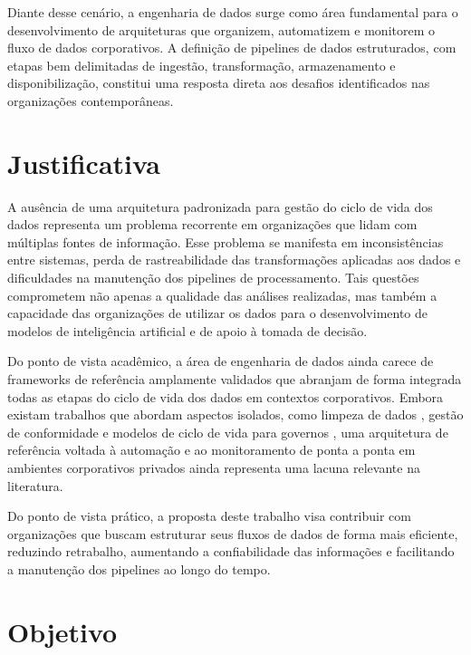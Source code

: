 \documentclass[
    12pt,                %
    openright,           %
    oneside,             %
    a4paper,             %
    english,             %
    brazil               %
]{abntex2}
\begin{document}
Diante desse cenário, a engenharia de dados surge como área fundamental para o desenvolvimento de arquiteturas que organizem, automatizem e monitorem o fluxo de dados corporativos. A definição de pipelines de dados estruturados, com etapas bem delimitadas de ingestão, transformação, armazenamento e disponibilização, constitui uma resposta direta aos desafios identificados nas organizações contemporâneas.

\section{Justificativa}
\label{sec:justificativa}

A ausência de uma arquitetura padronizada para gestão do ciclo de vida dos dados representa um problema recorrente em organizações que lidam com múltiplas fontes de informação. Esse problema se manifesta em inconsistências entre sistemas, perda de rastreabilidade das transformações aplicadas aos dados e dificuldades na manutenção dos pipelines de processamento. Tais questões comprometem não apenas a qualidade das análises realizadas, mas também a capacidade das organizações de utilizar os dados para o desenvolvimento de modelos de inteligência artificial e de apoio à tomada de decisão.

Do ponto de vista acadêmico, a área de engenharia de dados ainda carece de frameworks de referência amplamente validados que abranjam de forma integrada todas as etapas do ciclo de vida dos dados em contextos corporativos. Embora existam trabalhos que abordam aspectos isolados, como limpeza de dados \cite{Valova2025}, gestão de conformidade \cite{Scope2022} e modelos de ciclo de vida para governos \cite{Shah2021}, uma arquitetura de referência voltada à automação e ao monitoramento de ponta a ponta em ambientes corporativos privados ainda representa uma lacuna relevante na literatura.

Do ponto de vista prático, a proposta deste trabalho visa contribuir com organizações que buscam estruturar seus fluxos de dados de forma mais eficiente, reduzindo retrabalho, aumentando a confiabilidade das informações e facilitando a manutenção dos pipelines ao longo do tempo.

\section{Objetivo}
\label{sec:objetivo}
\end{document}

